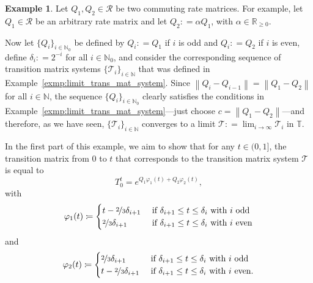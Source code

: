 \documentclass[10pt,a4paper]{paper}
\theoremstyle{definition}
\newtheorem{exmp}{Example}%
\newcommand{\nats}{\mathbb{N}}
\newcommand{\reals}{\mathbb{R}}
\newcommand{\realsnonneg}{\reals_{\geq 0}}
\newcommand{\norm}[1]{\left\lVert #1 \right\rVert}
\newcommand{\coloneqq}{:\!=}
\begin{document}
\begin{exmp}\label{exmp:limit_trans_mat_system_matrices}
Let $Q_1,Q_2\in\mathcal{R}$ be two commuting rate matrices. For example, let $Q_1\in\mathcal{R}$ be an arbitrary rate matrix and let $Q_2\coloneqq\alpha Q_1$, with $\alpha\in\realsnonneg$. 

Now let $\{Q_i\}_{i\in\nats_0}$ be defined by $Q_i\coloneqq Q_1$ if $i$ is odd and $Q_i\coloneqq Q_2$ if $i$ is even, define $\delta_i\coloneqq 2^{-i}$ for all $i\in\nats_0$, and consider the corresponding sequence of transition matrix systems $\{\mathcal{T}_i\}_{i\in\nats}$ that was defined in Example~\ref{exmp:limit_trans_mat_system}.  Since $\norm{Q_i-Q_{i-1}}=\norm{Q_1-Q_2}$ for all $i\in\nats$, the sequence $\{Q_i\}_{i\in\nats_0}$ clearly satisfies the conditions in Example~\ref{exmp:limit_trans_mat_system}---just choose $c=\norm{Q_1-Q_2}$---and therefore, as we have seen, $\{\mathcal{T}_i\}_{i\in\nats}$ converges to a limit $\mathcal{T}\coloneqq \lim_{i\to\infty}\mathcal{T}_i$ in $\mathbb{T}$. 


In the first part of this example, we aim to show that for any $t\in(0,1]$, the transition matrix from $0$ to $t$ that corresponds to the transition matrix system $\mathcal{T}$ is equal to
\vspace{4pt}
\begin{equation}\label{eq:ex4:def}
T_0^t=e^{Q_1\varphi_1(t)+Q_2\varphi_2(t)},
\end{equation}
with
\begin{equation}\label{eq:ex4:phi1}
\varphi_1(t)
\coloneqq
\begin{cases}
t-\nicefrac{2}{3}\delta_{i+1}
&\text{ if $\delta_{i+1}\leq t\leq\delta_{i}$ with $i$ odd}\\
\nicefrac{2}{3}\delta_{i+1}
&\text{ if $\delta_{i+1}\leq t\leq\delta_{i}$ with $i$ even} 
\end{cases}
\end{equation}
and
\begin{equation}\label{eq:ex4:phi2}
\varphi_2(t)
\coloneqq
\begin{cases}
\nicefrac{2}{3}\delta_{i+1}
&\text{ if $\delta_{i+1}\leq t\leq\delta_{i}$ with $i$ odd}\\
t-\nicefrac{2}{3}\delta_{i+1}
&\text{ if $\delta_{i+1}\leq t\leq\delta_{i}$ with $i$ even.} 
\end{cases}
\vspace{7pt}
\end{equation}


\end{exmp}
\end{document}
